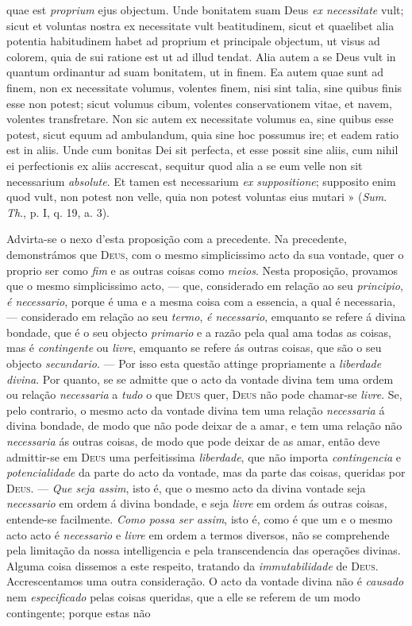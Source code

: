 quae est \emph{proprium} ejus objectum. Unde bonitatem suam Deus \emph{ex necessitate} vult; sicut et voluntas nostra ex necessitate vult beatitudinem, sicut et quaelibet alia potentia habitudinem habet ad proprium et principale objectum, ut visus ad colorem, quia de sui ratione est ut ad illud tendat. Alia autem a se Deus vult in quantum ordinantur ad suam bonitatem, ut in finem. Ea autem quae sunt ad finem, non ex necessitate volumus, volentes finem, nisi sint talia, sine quibus finis esse non potest; sicut volumus cibum, volentes conservationem vitae, et navem, volentes transfretare. Non sic autem ex necessitate volumus ea, sine quibus esse potest, sicut equum ad ambulandum, quia sine hoc possumus ire; et eadem ratio est in aliis. Unde cum bonitas Dei sit perfecta, et esse possit sine aliis, cum nihil ei perfectionis ex aliis accrescat, sequitur quod alia a se eum velle non sit necessarium \emph{absolute}. Et tamen est necessarium \emph{ex suppositione}; supposito enim quod vult, non potest non velle, quia non potest voluntas eius mutari » (\emph{Sum}. \emph{Th}., p. I, q. 19, a. 3).\par Advirta-se o nexo d'esta proposição com a precedente. Na precedente, demonstrámos que \textsc{Deus}, com o mesmo simplicissimo acto da sua vontade, quer o proprio ser como \emph{fim} e as outras coisas como \emph{meios}. Nesta proposição, provamos que o mesmo simplicissimo acto, --- que, considerado em relação ao seu \emph{principio}, \emph{é necessario}, porque é uma e a mesma coisa com a essencia, a qual é necessaria, --- considerado em relação ao seu \emph{termo}, \emph{é necessario}, emquanto se refere á divina bondade, que é o seu objecto \emph{primario} e a razão pela qual ama todas as coisas, mas é \emph{contingente} ou \emph{livre}, emquanto se refere ás outras coisas, que são o seu objecto \emph{secundario}. --- Por isso esta questão attinge propriamente a \emph{liberdade divina}. Por quanto, se se admitte que o acto da vontade divina tem uma ordem ou relação \emph{necessaria} a \emph{tudo} o que \textsc{Deus} quer, \textsc{Deus} não pode chamar-se \emph{livre}. Se, pelo contrario, o mesmo acto da vontade divina tem uma relação \emph{necessaria} á divina bondade, de modo que não pode deixar de a amar, e tem uma relação não \emph{necessaria} ás outras coisas, de modo que pode deixar de as amar, então deve admittir-se em \textsc{Deus} uma perfeitissima \emph{liberdade}, que não importa \emph{contingencia} e \emph{potencialidade} da parte do acto da vontade, mas da parte das coisas, queridas por \textsc{Deus}. --- \emph{Que seja assim}, isto é, que o mesmo acto da divina vontade seja \emph{necessario} em ordem á divina bondade, e seja \emph{livre} em ordem ás outras coisas, entende-se facilmente. \emph{Como possa ser assim}, isto é, como é que um e o mesmo acto acto é \emph{necessario} e \emph{livre} em ordem a termos diversos, não se comprehende pela limitação da nossa intelligencia e pela transcendencia das operações divinas. Alguma coisa dissemos a este respeito, tratando da \emph{immutabilidade} de \textsc{Deus}. Accrescentamos uma outra consideração. O acto da vontade divina não é \emph{causado} nem \emph{especificado} pelas coisas queridas, que a elle se referem de um modo contingente; porque estas não 